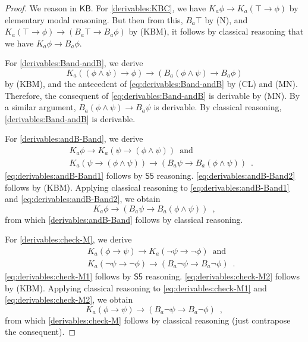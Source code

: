 \documentclass[12pt]{article}
\theoremstyle{definition}
\newcommand{\KB}{{\mathsf{KB}}}                        %
\begin{document}
\begin{proof}
  We reason in $\KB$. For \ref{derivables:KBC}, we have $K_a\phi\to
  K_a(\top\to\phi)$ by elementary modal reasoning.  But then from
  this, $B_a\top$ by (N), and $K_a(\top\to\phi)\to(B_a\top\to
  B_a\phi)$ by (KBM), it follows by classical reasoning that we have
  $K_a\phi\to B_a\phi$.

  For \ref{derivables:Band-andB}, we derive
  \begin{equation}
    K_a((\phi\land\psi)\to\phi)\to(B_a(\phi\land\psi)\to B_a\phi)
    \label{eq:derivables:Band-andB}
  \end{equation}
  by (KBM), and the antecedent of \eqref{eq:derivables:Band-andB} by (CL) and (MN).
  Therefore, the consequent of \eqref{eq:derivables:Band-andB} is derivable by (MN).
  By a similar argument,  $B_a(\phi\land\psi)\to B_a\psi$ is derivable.  By classical
  reasoning,
  \ref{derivables:Band-andB} is derivable.
  
  For \ref{derivables:andB-Band}, we derive
  \begin{eqnarray}
    &&
    K_a\phi\to K_a(\psi\to(\phi\land\psi)) \enspace\text{and}
    \label{eq:derivables:andB-Band1}
    \\
    &&
    K_a(\psi\to(\phi\land\psi))\to(B_a\psi\to B_a(\phi\land\psi)) \enspace\text{.}
    \label{eq:derivables:andB-Band2}
  \end{eqnarray}
  \eqref{eq:derivables:andB-Band1} follows by $\mathsf{S5}$ reasoning.
  \eqref{eq:derivables:andB-Band2} follows by (KBM).  Applying classical reasoning
  to \eqref{eq:derivables:andB-Band1} and \eqref{eq:derivables:andB-Band2},
  we obtain
  \[
  K_a\phi\to (B_a\psi\to B_a(\phi\land\psi))\enspace,
  \]
  from which \ref{derivables:andB-Band} follows by classical reasoning.

  For \ref{derivables:check-M}, we derive
  \begin{eqnarray}
    &&
    K_a(\phi\to\psi)\to K_a(\lnot\psi\to\lnot\phi) \enspace\text{and}
    \label{eq:derivables:check-M1}
    \\
    &&
    K_a(\lnot\psi\to\lnot\phi)\to(B_a\lnot\psi\to B_a\lnot\phi) \enspace\text{.}
    \label{eq:derivables:check-M2}
  \end{eqnarray}
  \eqref{eq:derivables:check-M1} follows by $\mathsf{S5}$ reasoning.
  \eqref{eq:derivables:check-M2} follows by (KBM).  Applying classical reasoning
  to \eqref{eq:derivables:check-M1} and \eqref{eq:derivables:check-M2},
  we obtain
  \[
  K_a(\phi\to\psi)\to(B_a\lnot\psi\to B_a\lnot\phi)\enspace,
  \]
  from which \ref{derivables:check-M} follows by classical reasoning
  (just contrapose the consequent).


\end{proof}
\end{document}
